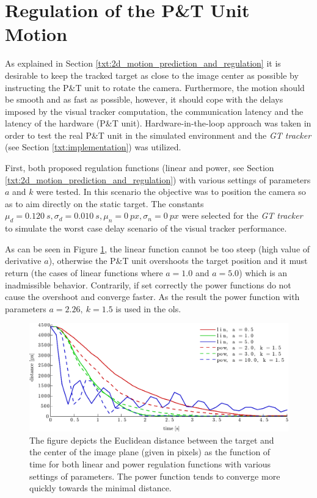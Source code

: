 \section{Regulation of the P\&T Unit Motion} \label{txt:test_regulation}

As explained in Section \ref{txt:2d_motion_prediction_and_regulation} it is desirable to keep the tracked target as close to the image center as possible by instructing the P\&T unit to rotate the camera. Furthermore, the motion should be smooth and as fast as possible, however, it should cope with the delays imposed by the visual tracker computation, the communication latency and the latency of the hardware (P\&T unit). Hardware-in-the-loop approach was taken in order to test the real P\&T unit in the simulated environment and the \textit{GT tracker} (see Section \ref{txt:implementation}) was utilized.

First, both proposed regulation functions (linear and power, see Section \ref{txt:2d_motion_prediction_and_regulation}) with various settings of parameters $a$ and $k$ were tested. In this scenario the objective was to position the camera so as to aim directly on the static target. The constants $\mu_{d} = 0.120~s, \sigma_{d} = 0.010~s, \mu_{n} = 0~px, \sigma_{n} = 0~px$ were selected for the \textit{GT tracker} to simulate the worst case delay scenario of the visual tracker performance.

As can be seen in Figure \ref{fig:test_reg_lin_pow}, the linear function cannot be too steep (high value of derivative $a$), otherwise the P\&T unit overshoots the target position and it must return (the cases of linear functions where $a = 1.0$ and $a = 5.0$) which is an inadmissible behavior. Contrarily, if set correctly the power functions do not cause the overshoot and converge faster. As the result the power function with parameters $a = 2.26,~k = 1.5$ is used in the \gls{ols}.

\begin{figure}[htb]\centering
	\centering
	\includegraphics[width=0.75\linewidth]{fig/test_regulation_lin_pow.pdf}
	\caption{The figure depicts the Euclidean distance between the target and the center of the image plane (given in pixels) as the function of time for both linear and power regulation functions with various settings of parameters. The power function tends to converge more quickly towards the minimal distance.}
	\label{fig:test_reg_lin_pow}
\end{figure}

